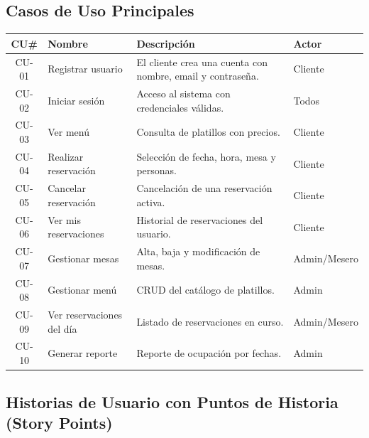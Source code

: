 \documentclass[12pt,a4paper]{article}
\begin{document}
\subsection{Casos de Uso Principales}

\begin{center}
{\small
\begin{tabular}{clp{6cm}l}
\toprule
\rowcolor{grisclaro}
\textbf{CU\#} & \textbf{Nombre} & \textbf{Descripción} & \textbf{Actor} \\
\midrule
CU-01 & Registrar usuario     & El cliente crea una cuenta con nombre, email y contraseña. & Cliente \\
\rowcolor{grisclaro}
CU-02 & Iniciar sesión        & Acceso al sistema con credenciales válidas. & Todos \\
CU-03 & Ver menú              & Consulta de platillos con precios. & Cliente \\
\rowcolor{grisclaro}
CU-04 & Realizar reservación  & Selección de fecha, hora, mesa y personas. & Cliente \\
CU-05 & Cancelar reservación  & Cancelación de una reservación activa. & Cliente \\
\rowcolor{grisclaro}
CU-06 & Ver mis reservaciones & Historial de reservaciones del usuario. & Cliente \\
CU-07 & Gestionar mesas       & Alta, baja y modificación de mesas. & Admin/Mesero \\
\rowcolor{grisclaro}
CU-08 & Gestionar menú        & CRUD del catálogo de platillos. & Admin \\
CU-09 & Ver reservaciones del día & Listado de reservaciones en curso. & Admin/Mesero \\
\rowcolor{grisclaro}
CU-10 & Generar reporte       & Reporte de ocupación por fechas. & Admin \\
\bottomrule
\end{tabular}}
\end{center}

\subsection{Historias de Usuario con Puntos de Historia (Story Points)}
\end{document}
